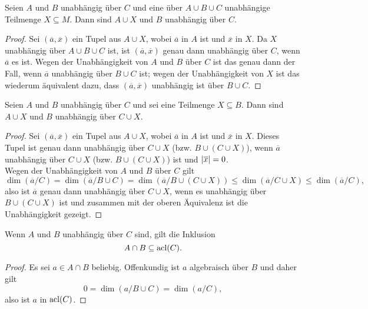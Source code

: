 \begin{lemma}
	Seien $A$ und $B$ unabhängig über $C$ und eine über $A\cup B\cup C$ unabhängige Teilmenge $X\subseteq M$. Dann sind $A\cup X$ und $B$ unabhängig über $C$.
\end{lemma}
\begin{proof}
	Sei $(\overline{a},\overline{x})$ ein Tupel aus $A\cup X$, wobei $\overline{a}$ in $A$ ist und $\overline{x}$ in $X$. Da $X$ unabhängig über $A\cup B\cup C$ ist, ist $(\overline{a},\overline{x})$ genau dann unabhängig über $C$, wenn $\overline{a}$ es ist. Wegen der Unabhängigkeit von $A$ und $B$ über $C$ ist das genau dann der Fall, wenn $\overline{a}$ unabhängig über $B\cup C$ ist; wegen der Unabhängigkeit von $X$ ist das wiederum äquivalent dazu, dass $(\overline{a},\overline{x})$ unabhängig ist über $B\cup C$.
\end{proof}
\newpage
\begin{lemma}
	Seien $A$ und $B$ unabhängig über $C$ und sei eine Teilmenge $X\subseteq B$. Dann sind $A\cup X$ und $B$ unabhängig über $C\cup X$.
\end{lemma}
\begin{proof}
	Sei $(\overline{a},\overline{x})$ ein Tupel aus $A\cup X$, wobei $\overline{a}$ in $A$ ist und $\overline{x}$ in $X$. Dieses Tupel ist genau dann unabhängig über $C\cup X$ (bzw. $B\cup(C\cup X)$), wenn $\overline{a}$ unabhängig über $C\cup X$ (bzw. $B\cup(C\cup X)$) ist und ${\left| \overline{x} \right|}=0$.\\
	Wegen der Unabhängigkeit von $A$ und $B$ über $C$ gilt $$\dim(\overline{a}/C)=\dim(\overline{a}/B\cup C)=\dim(\overline{a}/B\cup(C\cup X))\leq\dim(\overline{a}/C\cup X)\leq\dim(\overline{a}/C),$$ also ist $\overline{a}$ genau dann unabhängig über $C\cup X$, wenn es unabhängig über $B\cup(C\cup X)$ ist und zusammen mit der oberen Äquivalenz ist die Unabhängigkeit gezeigt.
\end{proof}

\begin{lemma}\label{Unabhängigkeit Schnitt}
	Wenn $A$ und $B$ unabhängig über $C$ sind, gilt die Inklusion $$A\cap B\subseteq\operatorname{acl}(C).$$
\end{lemma}
\begin{proof}
	Es sei $a\in A\cap B$ beliebig. Offenkundig ist $a$ algebraisch über $B$ und daher gilt $$0=\dim(a/B\cup C)=\dim(a/C),$$ also ist $a$ in $\operatorname{acl}(C)$.
\end{proof}

